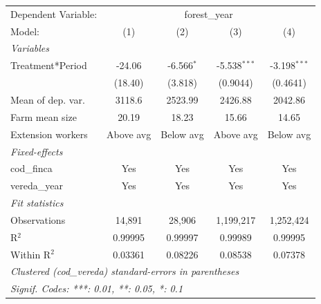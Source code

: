 
\begingroup
\centering
\begin{tabular}{lcccc}
   \tabularnewline \midrule \midrule
   Dependent Variable: & \multicolumn{4}{c}{forest\_year}\\
   Model:            & (1)       & (2)          & (3)            & (4)\\  
   \midrule
   \emph{Variables}\\
   Treatment*Period  & -24.06    & -6.566$^{*}$ & -5.538$^{***}$ & -3.198$^{***}$\\   
                     & (18.40)   & (3.818)      & (0.9044)       & (0.4641)\\   
   Mean of dep. var. & 3118.6    & 2523.99      & 2426.88        & 2042.86\\  
   Farm mean size    & 20.19     & 18.23        & 15.66          & 14.65\\  
   Extension workers & Above avg & Below avg    & Above avg      & Below avg\\  
   \midrule
   \emph{Fixed-effects}\\
   cod\_finca        & Yes       & Yes          & Yes            & Yes\\  
   vereda\_year      & Yes       & Yes          & Yes            & Yes\\  
   \midrule
   \emph{Fit statistics}\\
   Observations      & 14,891    & 28,906       & 1,199,217      & 1,252,424\\  
   R$^2$             & 0.99995   & 0.99997      & 0.99989        & 0.99995\\  
   Within R$^2$      & 0.03361   & 0.08226      & 0.08538        & 0.07378\\  
   \midrule \midrule
   \multicolumn{5}{l}{\emph{Clustered (cod\_vereda) standard-errors in parentheses}}\\
   \multicolumn{5}{l}{\emph{Signif. Codes: ***: 0.01, **: 0.05, *: 0.1}}\\
\end{tabular}
\par\endgroup


